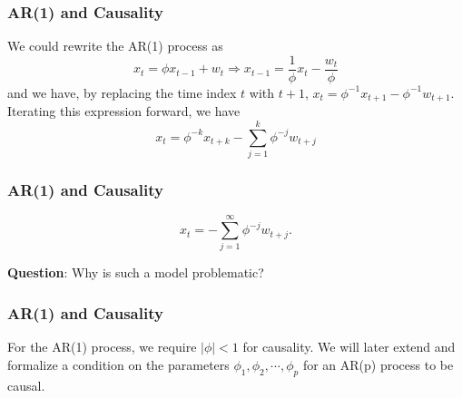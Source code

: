\documentclass[%
xcolor=pdftex]{beamer}
\begin{document}
\begin{frame}
\frametitle{AR(1) and Causality}

We could rewrite the AR(1) process as
 $$
 x_t=\phi x_{t-1} + w_t  \Rightarrow x_{t-1} = \frac{1}{\phi} x_t - \frac{w_t}{\phi}
 $$
 and we have, by replacing the time index $t$ with $t+1$, $x_t =\phi^{-1} x_{t+1} - \phi^{-1} w_{t+1}$. Iterating this expression
forward, we have
 $$
 x_t=\phi^{-k} x_{t+k}-\sum_{j=1}^{k} \phi^{-j} w_{t+j}
 $$


\end{frame}

\begin{frame}
\frametitle{AR(1) and Causality}

 
 $$
 x_t=-\sum_{j=1}^{\infty} \phi^{-j} w_{t+j}.
 $$


\textbf{Question}: Why is such a model problematic?


\end{frame}

\begin{frame}
\frametitle{AR(1) and Causality}

For the AR(1) process, we require $|\phi|<1$ for causality. We will later extend and formalize a condition on the parameters $\phi_1, \phi_2, \cdots, \phi_p$ for an AR(p) process to be causal.


\end{frame}
\end{document}
